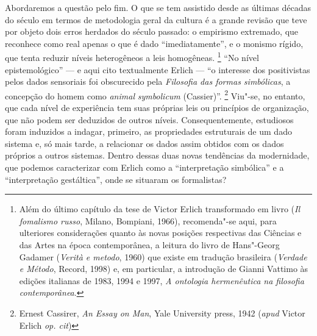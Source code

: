 Abordaremos a questão pelo fim. O que se tem assistido desde as últimas
décadas do século  em termos de metodologia geral da cultura é a
grande revisão que teve por objeto dois erros herdados do século
passado: o empirismo extremado, que reconhece como real apenas o que é
dado ``imediatamente'', e o monismo rígido, que tenta reduzir níveis
heterogêneos a leis homogêneas. \footnote{Além do último capítulo da
  tese de Victor Erlich transformado em livro (\emph{Il fomalismo
  russo}, Milano, Bompiani, 1966), recomenda"-se aqui, para ulteriores
  considerações quanto às novas posições respectivas das Ciências e das
  Artes na época contemporânea, a leitura do livro de Hans"-Georg Gadamer
  (\emph{Verità e metodo}, 1960) que existe em tradução brasileira
  (\emph{Verdade e Método}, Record, 1998) e, em particular, a introdução
  de Gianni Vattimo às edições italianas de 1983, 1994 e 1997, \emph{A
  ontologia hermenêutica na filosofia contemporânea}.} ``No nível
epistemológico'' --- e aqui cito textualmente Erlich --- ``o interesse dos
positivistas pelos dados sensoriais foi obscurecido pela \emph{Filosofia
das formas simbólicas}, a concepção do homem como \emph{animal}
\emph{symbolicum} (Cassier)''. \footnote{Ernest Cassirer, \emph{An Essay
  on Man}, Yale University press, 1942 (\emph{apud} Victor Erlich \emph{op. cit})}
Viu"-se, no entanto, que cada nível de experiência tem suas próprias leis ou
princípios de organização, que não podem ser deduzidos de outros níveis.
Consequentemente, estudiosos foram induzidos a indagar, primeiro, as
propriedades estruturais de um dado sistema e, só mais tarde, a
relacionar os dados assim obtidos com os dados próprios a outros
sistemas. Dentro dessas duas novas tendências da modernidade, que
podemos caracterizar com Erlich como a ``interpretação simbólica'' e a
``interpretação gestáltica'', onde se situaram os formalistas?

